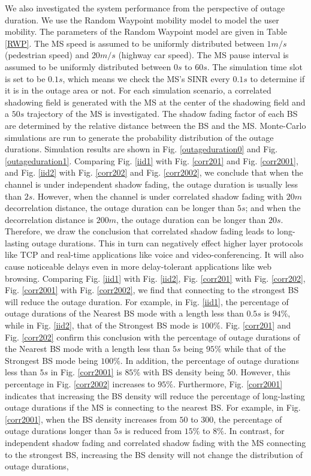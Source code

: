 \documentclass[journal,10pt]{IEEEtran}
\begin{document}
 \par We also investigated the system performance from the perspective of outage duration. We use the Random Waypoint mobility model \cite{camp2002survey} to model the user mobility. The parameters of the Random Waypoint model are given in Table \ref{RWP}. The MS speed is assumed to be uniformly distributed between $1m/s$ (pedestrian speed) and $20m/s$ (highway car speed). The MS pause interval is assumed to be uniformly distributed between $0s$ to $60s$. The simulation time slot is set to be $0.1s$, which means we check the MS's SINR every $0.1s$ to determine if it is in the outage area or not. For each simulation scenario, a correlated shadowing field is generated with the MS at the center of the shadowing field and a $50s$ trajectory of the MS is investigated. The shadow fading factor of each BS are determined by the relative distance between the BS and the MS. Monte-Carlo simulations are run to generate the probability distribution of the outage durations. Simulation results are shown in Fig. \ref{outageduration0} and Fig. \ref{outageduration1}. Comparing Fig. \ref{iid1} with Fig. \ref{corr201} and Fig. \ref{corr2001}, and Fig. \ref{iid2} with Fig. \ref{corr202} and Fig. \ref{corr2002}, we conclude that when the channel is under independent shadow fading, the outage duration is usually less than $2s$. However,  when the channel is under correlated shadow fading with $20m$ decorrelation distance, the outage duration can be longer than $5s$; and when the decorrelation distance is $200m$, the outage duration can be longer than $20s$. Therefore, we draw the conclusion that correlated shadow fading leads to long-lasting outage durations. This in turn can negatively effect higher layer protocols like TCP and real-time applications like voice and video-conferencing. It will also cause noticeable delays even in more delay-tolerant applications like web browsing. Comparing Fig. \ref{iid1} with Fig. \ref{iid2},  Fig. \ref{corr201} with Fig. \ref{corr202}, Fig. \ref{corr2001} with Fig. \ref{corr2002}, we find that connecting to the strongest BS will reduce the outage duration. For example, in Fig. \ref{iid1}, the percentage of outage durations of the Nearest BS mode with a length less than $0.5s$ is $94\%$, while in Fig. \ref{iid2}, that of the Strongest BS mode is $100\%$.  Fig. \ref{corr201} and Fig. \ref{corr202} confirm this conclusion with the percentage of outage durations of the Nearest BS mode with a length less than $5s$ being $95\%$ while that of the Strongest BS mode being $100\%$. In addition, the percentage of outage durations less than $5s$ in Fig. \ref{corr2001} is $85\%$ with BS density being $50$. However, this percentage in Fig. \ref{corr2002} increases to $95\%$. Furthermore, Fig. \ref{corr2001} indicates that increasing the BS density will reduce the percentage of long-lasting outage durations if the MS is connecting to the nearest BS. For example, in Fig. \ref{corr2001}, when the BS density increases from $50$ to $300$, the percentage of outage durations longer than $5s$ is reduced from $15\%$ to $8\%$. In contrast, for independent shadow fading and correlated shadow fading with the MS connecting to the strongest BS, increasing the BS density will not change the distribution of outage durations, 
\end{document}
